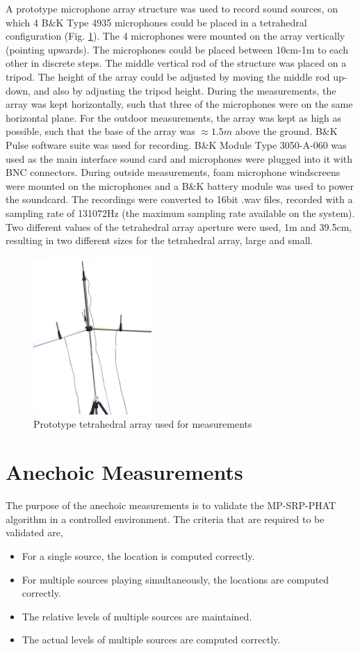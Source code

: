 A prototype microphone array structure was used to record sound sources, on which 4 B\&K Type 4935 microphones could be placed in a tetrahedral configuration (Fig. \ref{fig:arraymic1}). The 4 microphones were mounted on the array vertically (pointing upwards). The microphones could be placed between 10cm-1m to each other in discrete steps. The middle vertical rod of the structure was placed on a tripod. The height of the array could be adjusted by moving the middle rod up-down, and also by adjusting the tripod height. During the measurements, the array was kept horizontally, such that three of the microphones were on the same horizontal plane. For the outdoor measurements, the array was kept as high as possible, such that the base of the array was $\approx1.5m$ above the ground. B\&K Pulse software suite was used for recording. B\&K Module Type 3050-A-060 was used as the main interface sound card and microphones were plugged into it with BNC connectors. During outside measurements, foam microphone windscreens were mounted on the microphones and a B\&K battery module was used to power the soundcard. The recordings were converted to 16bit .wav files, recorded with a sampling rate of 131072Hz (the maximum sampling rate available on the system). Two different values of the tetrahedral array aperture were used, 1m and 39.5cm, resulting in two different sizes for the tetrahedral array, large and small.
\begin{figure}
    \centering
    \includegraphics[width=0.4\textwidth]{Figures/Arraymicrophone.png}
    \caption{\label{fig:arraymic1}Prototype tetrahedral array used for measurements}
\end{figure}
\section{Anechoic Measurements}
The purpose of the anechoic measurements is to validate the MP-SRP-PHAT algorithm in a controlled environment. The criteria that are required to be validated are,
\begin{itemize}
    \item For a single source, the location is computed correctly.
    \item For multiple sources playing simultaneously, the locations are computed correctly.
    \item The relative levels of multiple sources are maintained.
    \item The actual levels of multiple sources are computed correctly.
\end{itemize}
